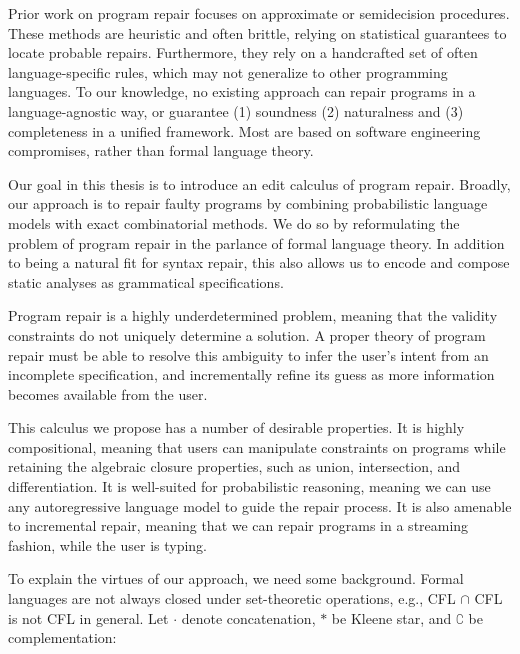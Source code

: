 Prior work on program repair focuses on approximate or semidecision procedures. These methods are heuristic and often brittle, relying on statistical guarantees to locate probable repairs. Furthermore, they rely on a handcrafted set of often language-specific rules, which may not generalize to other programming languages. To our knowledge, no existing approach can repair programs in a language-agnostic way, or guarantee (1) soundness (2) naturalness and (3) completeness in a unified framework. Most are based on software engineering compromises, rather than formal language theory.

Our goal in this thesis is to introduce an edit calculus of program repair. Broadly, our approach is to repair faulty programs by combining probabilistic language models with exact combinatorial methods. We do so by reformulating the problem of program repair in the parlance of formal language theory. In addition to being a natural fit for syntax repair, this also allows us to encode and compose static analyses as grammatical specifications.

Program repair is a highly underdetermined problem, meaning that the validity constraints do not uniquely determine a solution. A proper theory of program repair must be able to resolve this ambiguity to infer the user's intent from an incomplete specification, and incrementally refine its guess as more information becomes available from the user.

This calculus we propose has a number of desirable properties. It is highly compositional, meaning that users can manipulate constraints on programs while retaining the algebraic closure properties, such as union, intersection, and differentiation. It is well-suited for probabilistic reasoning, meaning we can use any autoregressive language model to guide the repair process. It is also amenable to incremental repair, meaning that we can repair programs in a streaming fashion, while the user is typing.

To explain the virtues of our approach, we need some background. Formal languages are not always closed under set-theoretic operations, e.g., CFL $\cap$ CFL is not CFL in general. Let $\cdot$ denote concatenation, $*$ be Kleene star, and $\complement$ be complementation:\\

